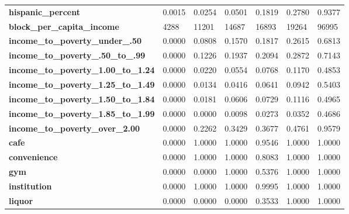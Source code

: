 \documentclass{article}
\begin{document}
\begin{table}[H]
\begin{center}
\begin{tabular}{lllllll}
\textbf{hispanic\_percent}   & 0.0015        & 0.0254           & 0.0501          & 0.1819        & 0.2780           & 0.9377       \\
\textbf{block\_per\_capita\_income}          & 4288          & 11201            & 14687           & 16893         & 19264            & 96995         \\
\textbf{income\_to\_poverty\_under\_.50}     & 0.0000        & 0.0808           & 0.1570          & 0.1817        & 0.2615           & 0.6813        \\
\textbf{income\_to\_poverty\_.50\_to\_.99}   & 0.0000        & 0.1226           & 0.1937          & 0.2094        & 0.2872           & 0.7143        \\
\textbf{income\_to\_poverty\_1.00\_to\_1.24} & 0.0000        & 0.0220           & 0.0554          & 0.0768        & 0.1170           & 0.4853        \\
\textbf{income\_to\_poverty\_1.25\_to\_1.49} & 0.0000        & 0.0134           & 0.0416          & 0.0641        & 0.0942           & 0.5403        \\
\textbf{income\_to\_poverty\_1.50\_to\_1.84} & 0.0000        & 0.0181           & 0.0606          & 0.0729        & 0.1116           & 0.4965        \\
\textbf{income\_to\_poverty\_1.85\_to\_1.99} & 0.0000        & 0.0000           & 0.0098          & 0.0273        & 0.0352           & 0.4686        \\
\textbf{income\_to\_poverty\_over\_2.00}     & 0.0000        & 0.2262           & 0.3429          & 0.3677        & 0.4761           & 0.9579        \\
\textbf{cafe}                                & 0.0000        & 1.0000           & 1.0000          & 0.9546        & 1.0000           & 1.0000        \\
\textbf{convenience}                         & 0.0000        & 1.0000           & 1.0000          & 0.8083        & 1.0000           & 1.0000        \\
\textbf{gym}                                 & 0.0000        & 0.0000           & 1.0000          & 0.5376        & 1.0000           & 1.0000        \\
\textbf{institution}                         & 0.0000        & 1.0000           & 1.0000          & 0.9995        & 1.0000           & 1.0000        \\
\textbf{liquor}                              & 0.0000        & 0.0000           & 0.0000          & 0.3533        & 1.0000           & 1.0000        \\

\end{tabular}
\end{center}
\end{table}
\end{document}
